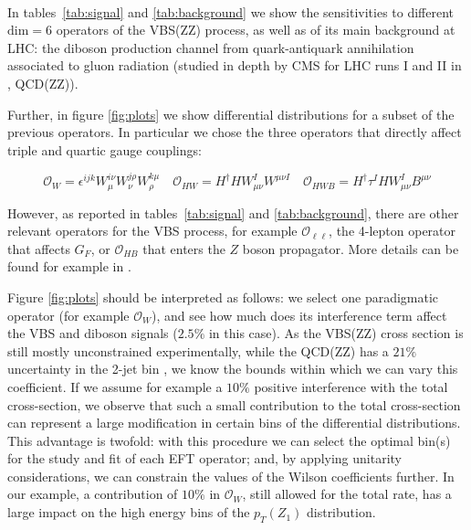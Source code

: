  
 
\\ 
In tables~\ref{tab:signal} and \ref{tab:background} we show the sensitivities to different $\mathrm{dim=6}$ operators of the VBS(ZZ) process, as well as of its main background at LHC: the diboson production channel from quark-antiquark annihilation associated to gluon radiation (studied in depth by CMS for LHC runs I and II in \cite{Sirunyan:2018vkx}, QCD(ZZ)). 

Further, in figure \ref{fig:plots} we show differential distributions for a subset of the previous operators. In particular we chose the three operators that directly affect triple and quartic gauge couplings:%

\begin{equation}
\mathcal{O}_W = \epsilon^{ijk} W_{\mu}^{i \nu} W_{\nu}^{j \rho} W_{\rho}^{k \mu} \quad
\mathcal{O}_{HW} = H^{\dagger} H W_{\mu \nu}^I W^{\mu \nu I}\quad
\mathcal{O}_{HWB} = H^{\dagger} \tau^I H W_{\mu \nu}^I B^{\mu \nu}
\end{equation}

 
However, as reported in tables~\ref{tab:signal} and \ref{tab:background}, there are other relevant operators for the VBS process, 
for example $\mathcal{O}_{\ell \ell}$, the 4-lepton operator that affects $G_F$, or $\mathcal{O}_{HB}$ that enters the $Z$ boson propagator. More details can be found for example in \cite{Ghezzi:2015vva}.
 
Figure \ref{fig:plots} should be interpreted as follows: we select one paradigmatic operator (for example $\mathcal{O}_W$), and see how much does its interference term affect the VBS and diboson signals ($2.5\%$ in this case). As the VBS(ZZ) cross section is still mostly unconstrained experimentally, while the QCD(ZZ) has a $21\%$ uncertainty in the 2-jet bin \cite{Sirunyan:2018vkx}, we know the bounds within which we can vary this coefficient. If we assume for example a $10 \%$ positive interference with the total cross-section, we observe that such a small contribution to the total cross-section can represent a large modification in certain bins of the differential distributions. This advantage is twofold: with this procedure we can select the optimal bin(s) for the study and fit of each EFT operator; and, by applying unitarity considerations, we can constrain the values of the Wilson coefficients further. In our example, a contribution of $10 \%$ in $\mathcal{O}_W$, still allowed for the total rate, has a large impact on the high energy bins of the $p_T (Z_1)$ distribution. 
\\
 
